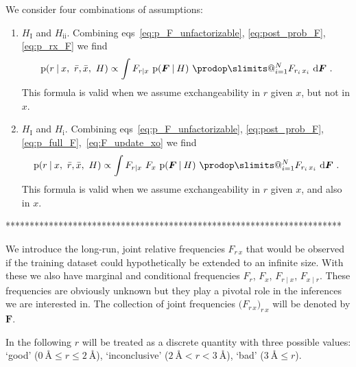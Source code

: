 \documentclass[\ifafour a4paper,12pt,\else a5paper,10pt,\fi%
onecolumn,oneside,article,%
british%
]{memoir}
\makeatletter
\theoremstyle{remark}
\theoremstyle{innote}
\def\prod{\DOTSI\prodop\slimits@}
\newcommand*{\di}{\mathrm{d}}%
\renewcommand*{\le}{\leqslant}%
\newcommand*{\p}{\mathrm{p}}%
\renewcommand*{\|}[1][]{\nonscript\:#1\vert\nonscript\:\mathopen{}}
\renewcommand*{\=}{\TextOrMath\texteq\eq}
\newcommand*{\eqns}{eqs}%
\newcommand*{\q}{}%
\DeclareRobustCommand*{\q}{%
  \mathord{\mathpalette\bigcdot@{}}%
}
\newcommand*{\bigcdot@scalefactor}{0.7}
\newcommand*{\bigcdot@widthfactor}{1.5}
\newcommand*{\bigcdot@}[2]{%
  \sbox0{$#1\vcenter{}$}%
  \sbox2{$#1\cdot\m@th$}%
  \hbox to \bigcdot@widthfactor\wd2{%
    \hfil
    \raise\ht0\hbox{%
      \scalebox{\bigcdot@scalefactor}{%
        \lower\ht0\hbox{$#1\bullet\m@th$}%
      }%
    }%
    \hfil
  }%
}
\newcommand*{\ro}{r}
\newcommand*{\xo}{x}
\newcommand*{\rd}{\bar{r}}
\newcommand*{\xd}{\bar{x}}
\newcommand*{\yF}{\bm{F}}
\makeatother
\begin{document}
We consider four combinations of assumptions:
\begin{enumerate}[label=\arabic*.]
\item $H_{\textrm{I}}$ and $H_{\textrm{ii}}$. Combining
  \eqns~\eqref{eq:p_F_unfactorizable}, \eqref{eq:post_prob_F},
  \eqref{eq:p_rx_F} we find
  \begin{equation}
    \label{eq:post_rx_simple}
    \p(\ro \| \xo,\ \rd,\xd,\ H) 
\propto  \int F_{\ro\mid\xo}\ \p(\yF\| H)\ 
    \prod_{i=1}^{N} F_{r_{i}\,x_{i}} \ \di\yF \ .
  \end{equation}
This formula is valid when we assume exchangeability in $r$ given $x$, but
not in $x$.
  
\item $H_{\textrm{I}}$ and $H_{\textrm{i}}$. Combining
  \eqns~\eqref{eq:p_F_unfactorizable}, \eqref{eq:post_prob_F},
  \eqref{eq:p_full_F},~\eqref{eq:F_update_xo} we find
  \begin{equation}
    \label{eq:post_rx_updated}
    \p(\ro \| \xo,\ \rd,\xd,\ H) 
\propto  \int F_{\ro\mid\xo}\ F_{\q\xo}\ \p(\yF\| H)\ 
    \prod_{i=1}^{N} F_{r_{i}\,x_{i}} \ \di\yF \ .
  \end{equation}
  This formula is valid when we assume exchangeability in $r$ given $x$,
  and also in $x$.
  
\end{enumerate}



**********************************************************************



We introduce the long-run, joint relative frequencies $F_{r\,x}$ that would
be observed if the training dataset could hypothetically be extended to an
infinite size. With these we also have
marginal and conditional frequencies $F_{r\q}$, $F_{\q x}$, $F_{r\mid x}$,
$F_{x \mid r}$. These frequencies are obviously unknown but they play a
pivotal role in the inferences we are interested in. The collection of
joint frequencies $\bigl(F_{r\,x}\bigr)_{r\,x}$ will be denoted by $\yF$.


In the following $r$ will be treated as a discrete quantity with three
possible values: \enquote*{good}
($0\ \textrm{\AA}\le r \le 2\ \textrm{\AA}$), \enquote*{inconclusive}
($2\ \textrm{\AA} < r < 3\ \textrm{\AA}$), \enquote*{bad}
($3\ \textrm{\AA} \le r$).
\end{document}
